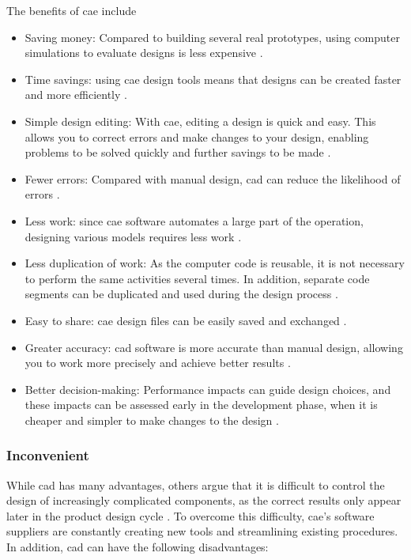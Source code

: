     The benefits of \acrshort{cae} include
    \begin{itemize}
        \item Saving money: Compared to building several real prototypes, using computer simulations to evaluate designs is less expensive \cite{sellgren1999simulation}.
        \item Time savings: using \acrshort{cae} design tools means that designs can be created faster and more efficiently \cite{sellgren1999simulation}.
        \item Simple design editing: With \acrshort{cae}, editing a design is quick and easy. This allows you to correct errors and make changes to your design, enabling problems to be solved quickly and further savings to be made \cite{sellgren1999simulation}.
        \item Fewer errors: Compared with manual design, \acrshort{cad} can reduce the likelihood of errors \cite{sellgren1999simulation}.
        \item Less work: since \acrshort{cae} software automates a large part of the operation, designing various models requires less work \cite{sellgren1999simulation}.
        \item Less duplication of work: As the computer code is reusable, it is not necessary to perform the same activities several times. In addition, separate code segments can be duplicated and used during the design process \cite{sellgren1999simulation}.
        \item Easy to share: \acrshort{cae} design files can be easily saved and exchanged \cite{sellgren1999simulation, jeon2016automatic}.
        \item Greater accuracy: \acrshort{cad} software is more accurate than manual design, allowing you to work more precisely and achieve better results \cite{sellgren1999simulation}.
        \item Better decision-making: Performance impacts can guide design choices, and these impacts can be assessed early in the development phase, when it is cheaper and simpler to make changes to the design \cite{sellgren1999simulation, validVerifSys}.
    \end{itemize}

    \subsubsection{Inconvenient}
    While \acrshort{cad} has many advantages, others argue that it is difficult to control the design of increasingly complicated components, as the correct results only appear later in the product design cycle \cite{karlberg2013state}. To overcome this difficulty, \acrshort{cae}'s software suppliers are constantly creating new tools and streamlining existing procedures. In addition, \acrshort{cad} can have the following disadvantages:

